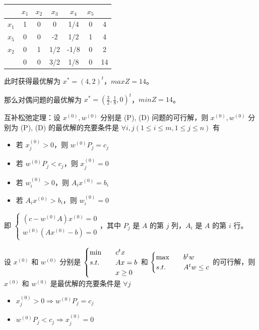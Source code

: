 \begin{example}
\begin{center}
        \begin{tabular}{c|ccccc|c}
            & $x_1$ & $x_2$ & $x_3$ & $x_4$ & $x_5$ & \\
            \hline
            $x_1$ & 1 & 0 & 0 & 1/4 & 0 & 4\\
            $x_5$ & 0 & 0 & -2 & 1/2 & 1 & 4\\
            $x_2$ & 0 & 1 & 1/2 & -1/8 & 0 & 2\\
            \hline
            & 0 & 0 & 3/2 & 1/8 & 0 & 14
        \end{tabular}
    \end{center}
    此时获得最优解为 $x^* = (4, 2)^t$，$maxZ = 14$。

    那么对偶问题的最优解为 $x^* = (\frac{3}{2}, \frac{1}{8}, 0)^t$，$minZ = 14$。
\end{example}

\begin{theorem}[互补松弛定理]
    互补松弛定理：设 $x^{(0)}, w^{(0)}$ 分别是 (P), (D) 问题的可行解，则 $x^{(0)},w^{(0)}$ 分别为 (P), (D) 的最优解的充要条件是 $\forall i, j (1 \le i \le m, 1\le j \le n)$ 有 \begin{itemize}
        \item 若 $x_j^{(0)} > 0$，则 $w^{(0)}P_j = c_j$
        \item 若 $w^{(0)}P_j < c_j$，则 $x_j^{(0)} = 0$
        \item 若 $w_i^{(0)} > 0$，则 $A_ix^{(0)} = b_i$
        \item 若 $A_ix^{(0)} > b_i$，则 $w_i^{(0)} = 0$
    \end{itemize}
    即 $\begin{cases}
        (c - w^{(0)}A)x^{(0)} = 0\\
        w^{(0)}(Ax^{(0)} - b) = 0
    \end{cases}$，其中 $P_j$ 是 $A$ 的第 $j$ 列，$A_i$ 是 $A$ 的第 $i$ 行。
\end{theorem}

\begin{theorem}[互补松弛定理非对称形式]
    \text{}

    设 $x^{(0)}$ 和 $w^{(0)}$ 分别是 $\begin{cases}
        \min \quad & c^tx \\
        s.t. \quad & Ax = b\\
        &x \ge 0
    \end{cases}$ 和 $\begin{cases}
        \max \quad & b^tw \\
        s.t. \quad & A^tw \le c
    \end{cases}$ 的可行解，则 $x^{(0)}$ 和 $w^{(0)}$ 是最优解的充要条件是 $\forall j$ \begin{itemize}
        \item $x_j^{(0)} > 0 \Longrightarrow w^{(0)}P_j = c_j$
        \item $w^{(0)}P_j < c_j \Longrightarrow x_j^{(0)} = 0$
    \end{itemize}
\end{theorem}

